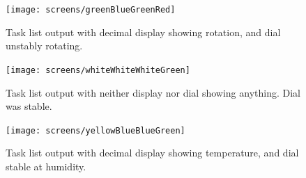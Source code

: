 \documentclass[12pt]{amsart}
\begin{document}
\begin{figure}[h]
    \texttt{[image: screens/greenBlueGreenRed]}
    \caption{Task list output with decimal display showing rotation, and dial unstably rotating.}
\end{figure}

\begin{figure}[h]
    \texttt{[image: screens/whiteWhiteWhiteGreen]}
    \caption{Task list output with neither display nor dial showing anything. Dial was stable.}
\end{figure}

\begin{figure}[h]
    \texttt{[image: screens/yellowBlueBlueGreen]}
    \caption{Task list output with decimal display showing temperature, and dial stable at humidity.}
\end{figure}
\end{document}
